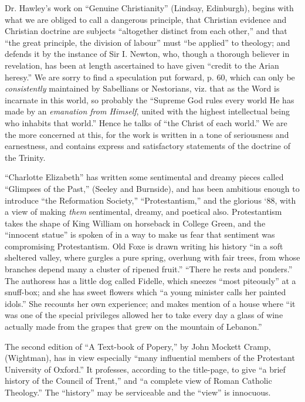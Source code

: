 Dr. Hawley's work on ``Genuine Christianity''
(Lindsay, Edinburgh), begins with what we are obliged to call a
dangerous principle, that Christian evidence and Christian doctrine are
subjects ``altogether distinct from each other,'' and that ``the great
principle, the division of labour'' must ``be applied'' to theology; and
defends it by the instance of Sir I. Newton, who, though a thorough
believer in revelation, has been at length ascertained to have given ``credit
to the Arian heresy.'' We are sorry to find a speculation put forward, p.
60, which can only be \emph{consistently} maintained by Sabellians or
Nestorians, viz. that as the Word is incarnate in this world, so
probably the ``Supreme God rules every world He has made by an \emph{emanation
from Himself}, united with the highest intellectual being who
inhabits that world.'' Hence he talks of ``the Christ of each world.'' We
are the more concerned at this, for the work is written in a tone of
seriousness and earnestness, and contains express and satisfactory
statements of the doctrine of the Trinity.

``Charlotte Elizabeth'' has written some sentimental
and dreamy pieces called ``Glimpses of the Past,'' (Seeley and Burnside),
and has been ambitious enough to introduce ``the Reformation Society,'' ``Protestantism,''
and the glorious ‘88, with a view of making \emph{them} sentimental,
dreamy, and poetical also. Protestantism takes the shape of King William
on horseback in College Green, and the ``innocent statue'' is spoken of in
a way to make us fear that sentiment was compromising Protestantism. Old
Foxe is drawn writing his history ``in a soft sheltered valley, where
gurgles a pure spring, overhung with fair trees, from whose branches
depend many a cluster of ripened fruit.'' ``There he rests and ponders.''
The authoress has a little dog called Fidelle, which sneezes ``most
piteously'' at a snuff-box; and she has sweet flowers which ``a young
minister calls her painted idols.'' She recounts her own experience; and
makes mention of a house where ``it was one of the special privileges
allowed her to take every day a glass of wine actually made from the
grapes that grew on the mountain of Lebanon.''

The second edition of ``A Text-book of Popery,'' by
John Mockett Cramp, (Wightman), has in view especially ``many influential
members of the Protestant University of Oxford.'' It professes, according
to the title-page, to give ``a brief history of the Council of Trent,''
and ``a complete view of Roman Catholic Theology.'' The ``history'' may be
serviceable and the ``view'' is innocuous.

